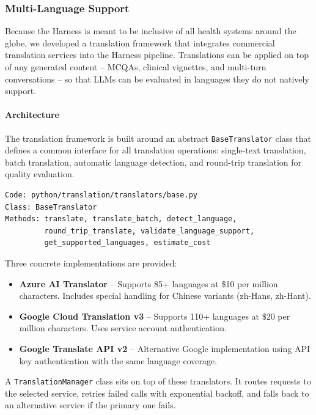 
\subsubsection{Multi-Language Support}
Because the Harness is meant to be inclusive of all health systems around the globe, we developed a translation framework that integrates commercial translation services into the Harness pipeline. Translations can be applied on top of any generated content -- MCQAs, clinical vignettes, and multi-turn conversations -- so that LLMs can be evaluated in languages they do not natively support.

\paragraph{Architecture}
The translation framework is built around an abstract \texttt{BaseTranslator} class that defines a common interface for all translation operations: single-text translation, batch translation, automatic language detection, and round-trip translation for quality evaluation.

\begin{verbatim}
Code: python/translation/translators/base.py
Class: BaseTranslator
Methods: translate, translate_batch, detect_language,
         round_trip_translate, validate_language_support,
         get_supported_languages, estimate_cost
\end{verbatim}

Three concrete implementations are provided:
\begin{itemize}
\item \textbf{Azure AI Translator} -- Supports 85+ languages at \$10 per million characters. Includes special handling for Chinese variants (zh-Hans, zh-Hant).
\item \textbf{Google Cloud Translation v3} -- Supports 110+ languages at \$20 per million characters. Uses service account authentication.
\item \textbf{Google Translate API v2} -- Alternative Google implementation using API key authentication with the same language coverage.
\end{itemize}

A \texttt{TranslationManager} class sits on top of these translators. It routes requests to the selected service, retries failed calls with exponential backoff, and falls back to an alternative service if the primary one fails.

